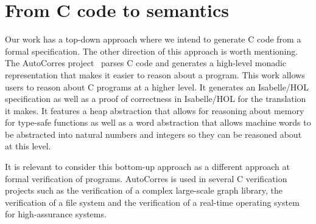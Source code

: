 \section{From C code to semantics}

Our work has a top-down approach where we intend to generate C code from a formal specification.
The other direction of this approach is worth mentioning.
The AutoCorres project~\parencite{autocorres} parses C code and generates a high-level monadic representation that makes it easier to reason about a program.
This work allows users to reason about C programs at a higher level.
It generates an Isabelle/HOL specification as well as a proof of correctness in Isabelle/HOL for the translation it makes.
It features a heap abstraction that allows for reasoning about memory for type-safe functions as well as a word abstraction that allows machine words to be abstracted into natural numbers and integers so they can be reasoned about at this level.

It is relevant to consider this bottom-up approach as a different approach at formal verification of programs.
AutoCorres is used in several C verification projects such as the verification of a complex large-scale graph library, the verification of a file system and the verification of a real-time operating system for high-assurance systems.
